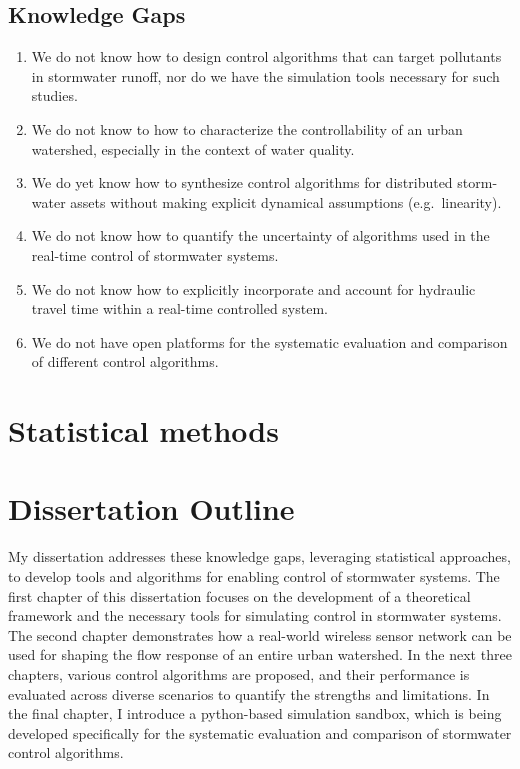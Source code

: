 \subsection*{Knowledge Gaps}
\begin{enumerate}
	\item We do not know how to design control algorithms that can target pollutants in stormwater runoff, nor do we have the simulation tools necessary for such studies.
	\item We do not know to how to characterize the controllability of an urban watershed, especially in the context of water quality.
	\item We do yet know how to synthesize control algorithms for distributed storm-water assets without making explicit dynamical assumptions (e.g.\ linearity).
	\item We do not know how to quantify the uncertainty of algorithms used in the real-time control of stormwater systems.
	\item We do not know how to explicitly incorporate and account for hydraulic travel time within a real-time controlled system.
	\item We do not have open platforms for the systematic evaluation and comparison of different control algorithms.
\end{enumerate}

\section{Statistical methods}

\section{Dissertation Outline}
\noindent My dissertation addresses these knowledge gaps, leveraging statistical approaches, to develop tools and algorithms for enabling control of stormwater systems. 
The first chapter of this dissertation focuses on the development of a theoretical framework and the necessary tools for simulating control in stormwater systems. 
The second chapter demonstrates how a real-world wireless sensor network can be used for shaping the flow response of an entire urban watershed. 
In the next three chapters, various control algorithms are proposed, and their performance is evaluated across diverse scenarios to quantify the strengths and limitations.
In the final chapter, I introduce a python-based simulation sandbox, which is being developed specifically for the systematic evaluation and comparison of stormwater control algorithms.
